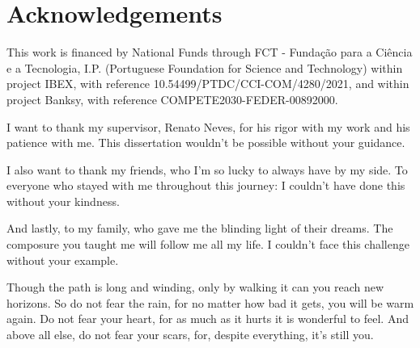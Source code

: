 \chapter*{Acknowledgements}
\setlength{\parskip}{1em}

This work is financed by National Funds through FCT - Fundação para a Ciência e a Tecnologia, I.P. (Portuguese Foundation for Science and Technology) within project IBEX, with reference 10.54499/PTDC/CCI-COM/4280/2021, and within project Banksy, with reference COMPETE2030-FEDER-00892000.

I want to thank my supervisor, Renato Neves, for his rigor with my work and his patience with me. This dissertation wouldn't be possible without your guidance.

I also want to thank my friends, who I'm so lucky to always have by my side. To everyone who stayed with me throughout this journey: I couldn't have done this without your kindness.

And lastly, to my family, who gave me the blinding light of their dreams. The composure you taught me will follow me all my life. I couldn't face this challenge without your example.


Though the path is long and winding, only by walking it can you reach new horizons. So do not fear the rain, for no matter how bad it gets, you will be warm again. Do not fear your heart, for as much as it hurts it is wonderful to feel. And above all else, do not fear your scars, for, despite everything, it's still you.

\setlength{\parskip}{0em}
